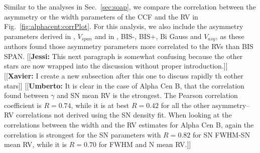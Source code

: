 \documentclass{aa}
\newcommand{\jessi}[1]{{\color{Purple}[[\textbf{Jessi: }#1]]}}
\newcommand{\xavier}[1]{{\color{blue}[[\textbf{Xavier: }#1]]}}
\newcommand{\umberto}[1]{{\color{green}[[\textbf{Umberto: }#1]]}}
\begin{document}
Similar to the analyses in Sec.~\ref{sec:soap}, we compare the correlation between the asymmetry or the width parameters of the CCF and the RV in Fig.~\ref{fig:alphacent:corrPlot}. 
For this analysis, we also include the asymmetry parameters derived in \citet{Boisse-2011}, $V_{span}$ and in \citet{Figueira-2013}, BIS-, BIS+, Bi Gauss and $V_{asy}$, as these authors found those asymmetry parameters more correlated to the RVs than BIS SPAN. 
\jessi{This next paragraph is somewhat confusing because the other stars are now wrapped into the discussion without proper introduction.}
\xavier{I create a new subsection after this one to discuss rapidly th eother stars}
\umberto{It is clear in the case of Alpha Cen B, that the correlation found between $\gamma$ and SN mean RV is the strongest. 
The Pearson correlation coefficient is $R=0.74$, while it is at best $R=0.42$ for all the other asymmetry--RV correlations not derived using the SN density fit.
When looking at the correlations between the width and the RV estimates for Alpha Cen B, again the correlation is strongest for the SN parameters with $R=0.82$ for SN FWHM-SN mean RV, while it is $R=0.70$ for FWHM and N mean RV.}
%
%
\end{document}

